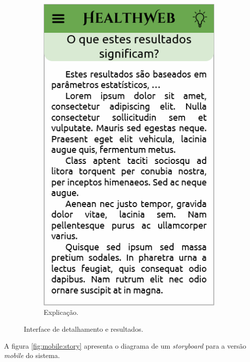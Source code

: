 \begin{figure}[htbp]
\begin{subfigure}{0.24\linewidth}
		\includegraphics[width=\linewidth]{figure/prototype/mobile/meaning.png}
		\caption{Explicação.}
		\label{fig:mobile:meaning}
	\end{subfigure}
	\caption{Interface de detalhamento e resultados.}
	\label{fig:mobile:results_this_disease_disease_page_meaning}
\end{figure}

A figura \ref{fig:mobile:story} apresenta o diagrama de um \textit{storyboard} para a versão \textit{mobile} do sistema.

